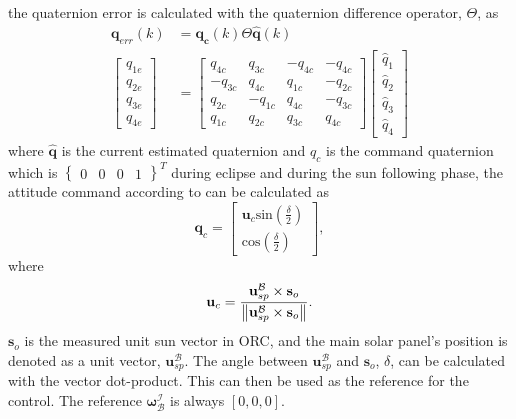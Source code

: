 the quaternion error is calculated with the quaternion difference operator, $\Theta$, as
\begin{equation}
	\begin{aligned}
		\mathbf{q}_{err}(k) &= \mathbf{q_c}(k) \Theta \hat{\mathbf{q}}(k) \\
		\begin{bmatrix} 
			q_{1e} \\
			q_{2e} \\
			q_{3e} \\
			q_{4e}
		\end{bmatrix} &= \begin{bmatrix} 
			q_{4c} & q_{3c} & -q_{4c} & -q_{4c} \\
			-q_{3c} & q_{4c} & q_{1c} & -q_{2c} \\
			q_{2c} & - q_{1c} & q_{4c} & -q_{3c} \\
			q_{1c} & q_{2c} & q_{3c} & q_{4c}
		\end{bmatrix}
		\begin{bmatrix} 
			\hat{q}_1 \\
			\hat{q}_2 \\
			\hat{q}_3 \\
			\hat{q}_4
		\end{bmatrix}
	\end{aligned}
	\label{eq:quaternionError}
\end{equation}
where $\hat{\mathbf{q}}$ is the current estimated quaternion and $q_{c}$ is the command quaternion which is $\begin{Bmatrix}
	0 & 0 & 0& 1
\end{Bmatrix}^T$ during eclipse and during the sun following phase, the attitude command according to \cite{chen2000ground} can be calculated as 
\begin{equation}
	\mathbf{q}_c = \begin{bmatrix}
		\mathbf{u}_c \text{sin}(\frac{\delta}{2}) \\
		\text{cos}(\frac{\delta}{2})
	\end{bmatrix},
\end{equation}
where 
\begin{equation}
	\mathbf{u}_c = \frac{\mathbf{u}_{sp}^{\mathcal{B}} \times \mathbf{s}_o}{\left\lVert\mathbf{u}_{sp}^{\mathcal{B}} \times \mathbf{s}_o\right\rVert}.
\end{equation}
$\mathbf{s}_o$ is the measured unit sun vector in ORC, and the main solar panel's position is denoted as a unit vector, $\mathbf{u}_{sp}^{\mathcal{B}}$. The angle between $\mathbf{u}_{sp}^{\mathcal{B}}$ and $\mathbf{s}_o$, $\delta$, can be calculated with the vector dot-product. This can then be used as the reference for the control. The reference $\boldsymbol{\omega}_{\mathcal{B}}^{\mathcal{I}}$ is always $[0, 0, 0]$. 

